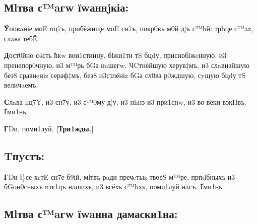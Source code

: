 \subsection[Молитва святаго Иоанникия]
{Мlтва с™aгw їwаннjкіа:}

\textbf{Ў}повaніе моE nц7ъ, прибёжище моE сн7ъ, покр0въ м0й д¦ъ с™hй: трbце с™az,
слaва тебЁ.

\textbf{Д}ост0йно є4сть ћкw вои1стинну, бlжи1ти тS бцdу, приснобlжeнную, и3
пренепор0чную, и3 м™рь бGа нaшегw. ЧCтнёйшую херув‡мъ, и3 слaвнэйшую
без8 сравнeніz сераф‡мъ, без8 и3стлёніz бGа сл0ва р0ждшую, сyщую бцdу тS
величaемъ.

\textbf{С}лaва nц7Y, и3 сн7у, и3 с™0му д¦у, и3 нhнэ и3 при1снw, и3 во вёки
вэкHвъ. Ґми1нь.

\textbf{Г}Dи, поми1луй. \textbf{{[}Три1жды.{]}}

\subsection[Отпуст]{Tпyстъ:}

\textbf{Г}Dи ї\}се хrтE сн7е б9ій, мlтвъ рaди пречcтыz твоеS м™ре, прпdбныхъ и3
бGон0сныхъ nтє1цъ нaшихъ, и3 всёхъ с™hхъ, поми1луй нaсъ. Ґми1нь.

\subsection[Молитва святаго Иоанна Дамаскина]
{Мlтва с™aгw їwaнна дамаски1на:}

